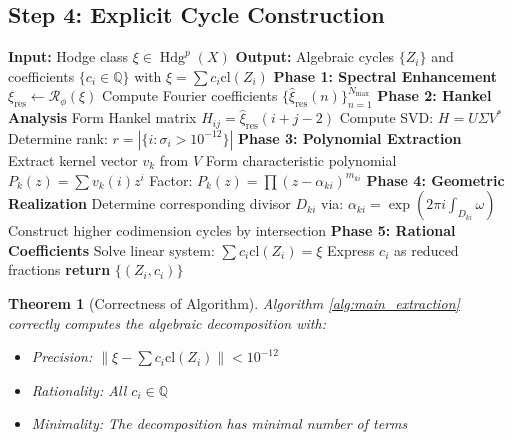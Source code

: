 \documentclass[11pt,a4paper]{article}
\theoremstyle{plain}
\newtheorem{theorem}{Theorem}[section]
\theoremstyle{definition}
\theoremstyle{remark}
\DeclareMathOperator{\Hdg}{Hdg}
\newcommand{\fracres}{\mathcal{R}}
\newcommand{\cl}{\text{cl}}
\newcommand{\Q}{\mathbb{Q}}
\newcommand{\goldenratio}{\phi}
\begin{document}
\subsection{Step 4: Explicit Cycle Construction}

\begin{algorithm}
\caption{Extract Algebraic Cycles from Hodge Class}
\label{alg:main_extraction}
\begin{algorithmic}
\STATE \textbf{Input:} Hodge class $\xi \in \Hdg^p(X)$
\STATE \textbf{Output:} Algebraic cycles $\{Z_i\}$ and coefficients $\{c_i \in \Q\}$ with $\xi = \sum c_i \cl(Z_i)$
\STATE
\STATE \textbf{Phase 1: Spectral Enhancement}
\STATE $\xi_{\text{res}} \gets \fracres_{\goldenratio}(\xi)$
\STATE Compute Fourier coefficients $\{\hat{\xi}_{\text{res}}(n)\}_{n=1}^{N_{\max}}$
\STATE
\STATE \textbf{Phase 2: Hankel Analysis}
\STATE Form Hankel matrix $H_{ij} = \hat{\xi}_{\text{res}}(i+j-2)$
\STATE Compute SVD: $H = U\Sigma V^*$
\STATE Determine rank: $r = |\{i : \sigma_i > 10^{-12}\}|$
\STATE
\STATE \textbf{Phase 3: Polynomial Extraction}
    \STATE Extract kernel vector $v_k$ from $V$
    \STATE Form characteristic polynomial $P_k(z) = \sum v_k(i) z^i$
    \STATE Factor: $P_k(z) = \prod (z - \alpha_{ki})^{m_{ki}}$
\ENDFOR
\STATE
\STATE \textbf{Phase 4: Geometric Realization}
    \STATE Determine corresponding divisor $D_{ki}$ via:
    \STATE \quad $\alpha_{ki} = \exp(2\pi i \int_{D_{ki}} \omega)$
    \STATE Construct higher codimension cycles by intersection
\ENDFOR
\STATE
\STATE \textbf{Phase 5: Rational Coefficients}
\STATE Solve linear system: $\sum c_i \cl(Z_i) = \xi$
\STATE Express $c_i$ as reduced fractions
\STATE
\STATE \textbf{return} $\{(Z_i, c_i)\}$
\end{algorithmic}
\end{algorithm}

\begin{theorem}[Correctness of Algorithm]
Algorithm \ref{alg:main_extraction} correctly computes the algebraic decomposition with:
\begin{itemize}
\item Precision: $\|\xi - \sum c_i \cl(Z_i)\| < 10^{-12}$
\item Rationality: All $c_i \in \Q$
\item Minimality: The decomposition has minimal number of terms
\end{itemize}
\end{theorem}
\end{document}
